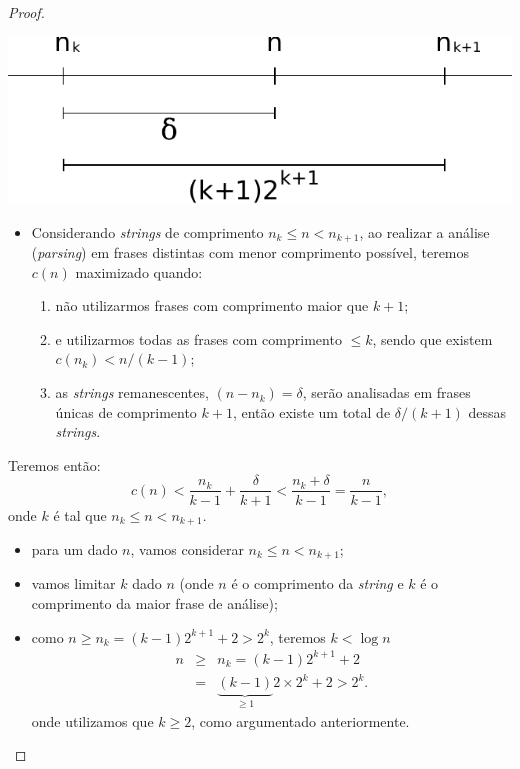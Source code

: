 \begin{frame}[allowframebreaks]
\begin{proof}
\begin{itemize}
	\includegraphics[width=0.6\linewidth]{images/nnkinterval.pdf}
	\end{itemize}

	\proofbreak
	\begin{itemize}
        \item Considerando \textit{strings} de comprimento $n_k \leq n < n_{k+1}$,
		ao realizar a análise (\textit{parsing}) em frases distintas 
		com menor comprimento possível, teremos $c(n)$ maximizado quando:
		\begin{enumerate}
		\item não utilizarmos frases com comprimento maior que $k+1$;
		\item e utilizarmos todas as frases com comprimento $\leq k$, sendo
			que existem $c(n_k) < n / (k-1)$;
		\item as \textit{strings} remanescentes, $(n - n_k) = \delta$, serão 
			analisadas em frases únicas de comprimento $k+1$, então existe
			um total de $\delta / (k+1)$ dessas \textit{strings}.
		\end{enumerate}
	\end{itemize}
	\proofbreak

	Teremos então:
	\begin{equation}
	c(n) < \frac{n_k}{k-1} + \frac{\delta}{k+1} < \frac{n_k + \delta}{k - 1} = \frac{n}{k - 1} ,
	\end{equation}
	onde $k$ é tal que $n_k \leq n < n_{k+1}$.

	\proofbreak

	\begin{itemize}
	\item para um dado $n$, vamos considerar $n_k \leq n < n_{k+1}$;
	\item vamos limitar $k$ dado $n$ (onde $n$ é o comprimento da \textit{string} e
		$k$ é o comprimento da maior frase de análise);
	\item como $n \geq n_k = (k-1)2^{k+1} + 2 > 2^k$, teremos $k < \log n$
		\begin{eqnarray}
		n &\geq& n_k = (k-1)2^{k+1} + 2 \nonumber \\
			&=& \underbrace{(k-1)}_{\geq 1} 2 \times 2^k + 2 > 2^k .
		\end{eqnarray}
	onde utilizamos que $k \geq 2$, como argumentado anteriormente.
	\end{itemize}


\end{proof}
\end{frame}
